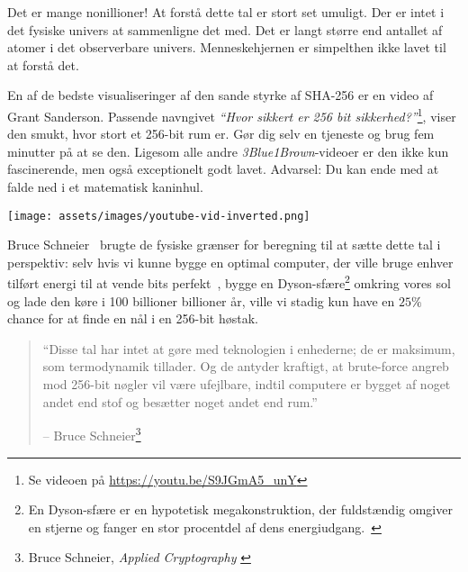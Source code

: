 Det er mange nonillioner! At forstå dette tal er stort set umuligt. Der er intet i det fysiske univers at sammenligne det med. Det er langt større end antallet af atomer i det observerbare univers. Menneskehjernen er simpelthen ikke lavet til at forstå det.

\newpage

En af de bedste visualiseringer af den sande styrke af SHA-256 er en video af Grant Sanderson. Passende navngivet \textit{\enquote{Hvor sikkert er 256 bit sikkerhed?}}\footnote{Se videoen på \url{https://youtu.be/S9JGmA5_unY}}, viser den smukt, hvor stort et 256-bit rum er. Gør dig selv en tjeneste og brug fem minutter på at se den. Ligesom alle andre \textit{3Blue1Brown}-videoer er den ikke kun fascinerende, men også exceptionelt godt lavet. Advarsel: Du kan ende med at falde ned i et matematisk kaninhul.

\begin{center}
  \texttt{[image: assets/images/youtube-vid-inverted.png]}
  \label{fig:youtube-vid-inverted}
\end{center}

Bruce Schneier~\cite{web:schneier} brugte de fysiske grænser for beregning til at sætte dette tal i perspektiv: selv hvis vi kunne bygge en optimal computer, der ville bruge enhver tilført energi til at vende bits perfekt~\cite{wiki:landauer}, bygge en Dyson-sfære\footnote{En Dyson-sfære er en hypotetisk megakonstruktion, der fuldstændig omgiver en stjerne og fanger en stor procentdel af dens energiudgang.~\cite{wiki:dyson}} omkring vores sol og lade den køre i 100 billioner billioner år, ville vi stadig kun have en $25\%$ chance for at finde en nål i en 256-bit høstak.

\begin{quotation}\begin{samepage}
  \enquote{Disse tal har intet at gøre med teknologien i enhederne;
  de er maksimum, som termodynamik tillader. Og
  de antyder kraftigt, at brute-force angreb mod 256-bit nøgler vil være
  ufejlbare, indtil computere er bygget af noget andet end stof
  og besætter noget andet end rum.}
  \begin{flushright} -- Bruce Schneier\footnote{Bruce Schneier, \textit{Applied Cryptography} \cite{bruce-schneier}}
  \end{flushright}\end{samepage}\end{quotation}
  

